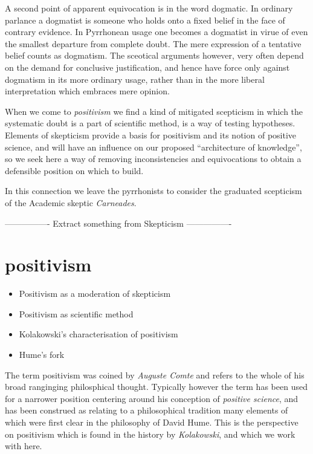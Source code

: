 A second point of apparent equivocation is in the word dogmatic.
In ordinary parlance a dogmatist is someone who holds onto a fixed belief in the face of contrary evidence.
In Pyrrhonean usage one becomes a dogmatist in virue of even the smallest departure from complete doubt.
The mere expression of a tentative belief counts as dogmatism.
The sceotical arguments however, very often depend on the demand for conclusive justification, and hence have force only against dogmatism in its more ordinary usage, rather than in the more liberal interpretation which embraces mere opinion.

When we come to {\it positivism} we find a kind of mitigated scepticism in which the systematic doubt is a part of scientific method, is a way of testing hypotheses.
Elements of skepticism provide a basis for positivism and its notion of positive science, and will have an influence on our proposed ``architecture of knowledge'', so we seek here a way of removing inconsistencies and equivocations to obtain a defensible position on which to build.

In this connection we leave the pyrrhonists to consider the graduated scepticism of the Academic skeptic {\it Carneades}.

---------------- Extract something from Skepticism ----------------


\section{positivism}

\begin{itemize}
\item Positivism as a moderation of skepticism
\item Positivism as scientific method
\item Kolakowski's characterisation of positivism
\item Hume's fork
\end{itemize}

The term positivism was coined by \emph{Auguste Comte} and refers to the whole of his broad ranginging philosphical thought.
Typically however the term has been used for a narrower position centering around his conception of \emph{positive science}, and has been construed as relating to a philosophical tradition many elements of which were first clear in the philosophy of David Hume.
This is the perspective on positivism which is found in the history by \emph{Kolakowski}\cite{kolakowskiPP}, and which we work with here.

